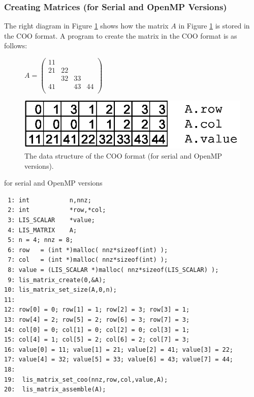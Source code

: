 \documentclass[a4paper]{article}
\begin{document}
\subsubsection{Creating Matrices (for Serial and OpenMP Versions)}
The right diagram in Figure \ref{fig:storage10} shows how the matrix $A$ in Figure \ref{fig:storage10} is stored in the COO format. A program to create the matrix in the COO format is as follows:
\begin{figure}[h]
{\centering 
\begin{minipage}{0.3\textwidth}
\begin{flushright}
$ 
A = \left(
\begin{array}{cccc}
11 &    &    &    \\
21 & 22 &    &    \\
   & 32 & 33 &    \\
41 &    & 43 & 44 \\
\end{array}\right)
$
\end{flushright}
\end{minipage}
\begin{minipage}{0.6\textwidth}
\begin{flushleft}
\includegraphics{storage10.eps} 
\end{flushleft}
\end{minipage}
\caption{The data structure of the COO format (for serial and OpenMP versions).}\label{fig:storage10}}
\end{figure}
\begin{itembox}[l]{for serial and OpenMP versions}
\small
\begin{verbatim}
 1: int           n,nnz;
 2: int           *row,*col;
 3: LIS_SCALAR    *value;
 4: LIS_MATRIX    A;
 5: n = 4; nnz = 8;
 6: row   = (int *)malloc( nnz*sizeof(int) );
 7: col   = (int *)malloc( nnz*sizeof(int) );
 8: value = (LIS_SCALAR *)malloc( nnz*sizeof(LIS_SCALAR) );
 9: lis_matrix_create(0,&A);
10: lis_matrix_set_size(A,0,n);
11:
12: row[0] = 0; row[1] = 1; row[2] = 3; row[3] = 1;
13: row[4] = 2; row[5] = 2; row[6] = 3; row[7] = 3;
14: col[0] = 0; col[1] = 0; col[2] = 0; col[3] = 1;
15: col[4] = 1; col[5] = 2; col[6] = 2; col[7] = 3;
16: value[0] = 11; value[1] = 21; value[2] = 41; value[3] = 22;
17: value[4] = 32; value[5] = 33; value[6] = 43; value[7] = 44;
18:
19:  lis_matrix_set_coo(nnz,row,col,value,A);
20:  lis_matrix_assemble(A);
\end{verbatim}
\end{itembox}
\newpage
\end{document}
